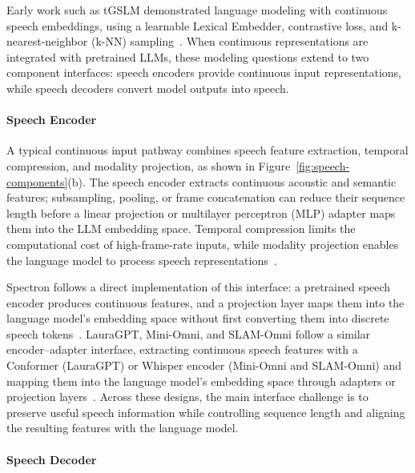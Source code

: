 Early work such as tGSLM demonstrated language modeling with continuous speech embeddings, using a learnable Lexical Embedder, contrastive loss, and k-nearest-neighbor (k-NN) sampling~\citep{DBLP:conf/emnlp/AlgayresANCSSD23}. When continuous representations are integrated with pretrained LLMs, these modeling questions extend to two component interfaces: speech encoders provide continuous input representations, while speech decoders convert model outputs into speech.

\paragraph{Speech Encoder}
\label{sec:speech-encoder}

A typical continuous input pathway combines speech feature extraction, temporal compression, and modality projection, as shown in Figure~\ref{fig:speech-components}(b). The speech encoder extracts continuous acoustic and semantic features; subsampling, pooling, or frame concatenation can reduce their sequence length before a linear projection or multilayer perceptron (MLP) adapter maps them into the LLM embedding space. Temporal compression limits the computational cost of high-frame-rate inputs, while modality projection enables the language model to process speech representations~\citep{DBLP:conf/iclr/NachmaniLHSAMRS24,DBLP:journals/corr/abs-2408-16725,DBLP:conf/acl/Chen0YLLXN00L0025}.

Spectron follows a direct implementation of this interface: a pretrained speech encoder produces continuous features, and a projection layer maps them into the language model's embedding space without first converting them into discrete speech tokens~\citep{DBLP:conf/iclr/NachmaniLHSAMRS24}. LauraGPT, Mini-Omni, and SLAM-Omni follow a similar encoder--adapter interface, extracting continuous speech features with a Conformer (LauraGPT) or Whisper encoder (Mini-Omni and SLAM-Omni) and mapping them into the language model's embedding space through adapters or projection layers~\citep{DBLP:journals/corr/abs-2310-04673,DBLP:journals/corr/abs-2408-16725,DBLP:conf/acl/Chen0YLLXN00L0025}. Across these designs, the main interface challenge is to preserve useful speech information while controlling sequence length and aligning the resulting features with the language model.

\paragraph{Speech Decoder}
\label{sec:speech-decoder}

